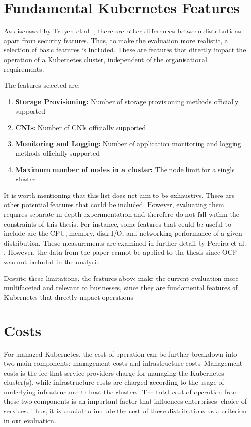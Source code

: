 \section{Fundamental Kubernetes Features}

As discussed by Truyen et al. \cite{truyenManagingFeatureCompatibility2020}, there are other differences between distributions apart from security features. Thus, to make the evaluation more realistic, a selection of basic features is included. These are features that directly impact the operation of a Kubernetes cluster, independent of the organisational requirements.

The features selected are:

\begin{enumerate}
  \item \textbf{Storage Provisioning:} Number of storage provisioning methods officially supported
  \item \textbf{CNIs:} Number of CNIs officially supported
  \item \textbf{Monitoring and Logging:} Number of application monitoring and logging methods officially supported
  \item \textbf{Maximum number of nodes in a cluster:} The node limit for a single cluster
\end{enumerate}

It is worth mentioning that this list does not aim to be exhaustive. There are other potential features that could be included. However, evaluating them requires separate in-depth experimentation and therefore do not fall within the constraints of this thesis. For instance, some features that could be useful to include are the CPU, memory, disk I/O, and networking performance of a given distribution. These measurements are examined in further detail by Pereira et al. \cite{pereiraferreiraPerformanceEvaluationContainers2019}. However, the data from the paper cannot be applied to the thesis since OCP was not included in the analysis.

Despite these limitations, the features above make the current evaluation more multifaceted and relevant to businesses, since they are fundamental features of Kubernetes that directly impact operations

\section{Costs}

For managed Kubernetes, the cost of operation can be further breakdown into two main components: management costs and infrastructure costs. Management costs is the fee that service providers charge for managing the Kubernetes cluster(s), while infrastructure costs are charged according to the usage of underlying infrastructure to host the clusters. The total cost of operation from these two components is an important factor that influences enterprises' choice of services. Thus, it is crucial to include the cost of these distributions as a criterion in our evaluation.

